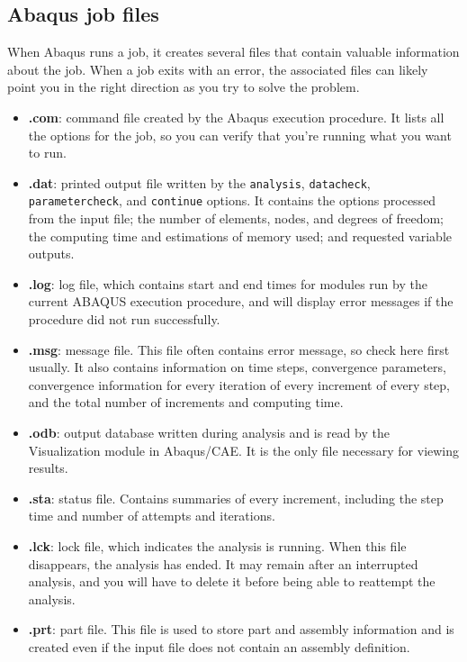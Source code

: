 \documentclass[10pt,letterpaper,oneside]{report}
\begin{document}
\subsection{Abaqus job files}
When Abaqus runs a job, it creates several files that contain valuable information about the job.  When a job exits with an error, the associated files can likely point you in the right direction as you try to solve the problem.  
\begin{itemize}
\item \textbf{.com}: command file created by the Abaqus execution procedure.  It lists all the options for the job, so you can verify that you're running what you want to run.
\item \textbf{.dat}: printed output file written by the \texttt{analysis}, \texttt{datacheck}, \texttt{parametercheck}, and \texttt{continue} options.  It contains the options processed from the input file; the number of elements, nodes, and degrees of freedom; the computing time and estimations of memory used; and requested variable outputs.
\item \textbf{.log}: log file, which contains start and end times for modules run by the current ABAQUS execution procedure, and will display error messages if the procedure did not run successfully.
\item \textbf{.msg}: message file.  This file often contains error message, so check here first usually.  It also contains information on time steps, convergence parameters, convergence information for every iteration of every increment of every step, and the total number of increments and computing time.
\item \textbf{.odb}: output database written during analysis and is read by the Visualization module in Abaqus/CAE.  It is the only file necessary for viewing results.
\item \textbf{.sta}: status file.  Contains summaries of every increment, including the step time and number of attempts and iterations.
\item \textbf{.lck}: lock file, which indicates the analysis is running.  When this file disappears, the analysis has ended.  It may remain after an interrupted analysis, and you will have to delete it before being able to reattempt the analysis.
\item \textbf{.prt}:  part file.  This file is used to store part and assembly information and is created even if the input file does not contain an assembly definition.
\end{itemize}
\end{document}

